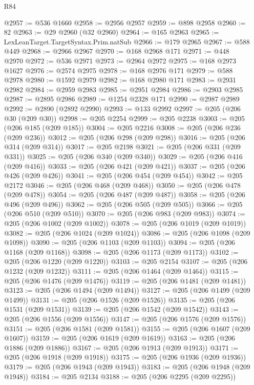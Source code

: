 \begin{lexlean}{R84}
\begin{coremodule}
@2957 := @536 @1660
@2958 := @2956 @2957
@2959 := @898 @2958
@2960 := 82
@2963 := @29 @2960 (@32 @2960)
@2964 := @165 @2963
@2965 := LexLeanTarget.TargetSyntax.Prim.natSub
@2966 := @179 @2965
@2967 := @588 @449
@2968 := @2966 @2967
@2970 := @168 @2968 @171
@2971 := @448 @2970
@2972 := @536 @2971
@2973 := @2964 @2972
@2975 := @168 @2973 @1627
@2976 := @2574 @2975
@2978 := @168 @2976 @171
@2979 := @588 @2978
@2980 := @1592 @2979
@2982 := @168 @2980 @171
@2983 := @2931 @2982
@2984 := @2959 @2983
@2985 := @2951 @2984
@2986 := @2903 @2985
@2987 := @2895 @2986
@2989 := @1254 @2328 @171
@2990 := @2987 @2989
@2992 := @2890 (@2892 @2990)
@2993 := @133 @2992
@2997 := @205 (@206 @30 (@209 @30))
@2998 := @205 @2254
@2999 := @205 @2238
@3003 := @205 (@206 @185 (@209 @185))
@3004 := @205 @2216
@3008 := @205 (@206 @236 (@209 @236))
@3012 := @205 (@206 @298 (@209 @298))
@3016 := @205 (@206 @314 (@209 @314))
@3017 := @205 @2198
@3021 := @205 (@206 @331 (@209 @331))
@3025 := @205 (@206 @340 (@209 @340))
@3029 := @205 (@206 @416 (@209 @416))
@3033 := @205 (@206 @421 (@209 @421))
@3037 := @205 (@206 @426 (@209 @426))
@3041 := @205 (@206 @454 (@209 @454))
@3042 := @205 @2172
@3046 := @205 (@206 @468 (@209 @468))
@3050 := @205 (@206 @478 (@209 @478))
@3054 := @205 (@206 @487 (@209 @487))
@3058 := @205 (@206 @496 (@209 @496))
@3062 := @205 (@206 @505 (@209 @505))
@3066 := @205 (@206 @510 (@209 @510))
@3070 := @205 (@206 @983 (@209 @983))
@3074 := @205 (@206 @1002 (@209 @1002))
@3078 := @205 (@206 @1019 (@209 @1019))
@3082 := @205 (@206 @1024 (@209 @1024))
@3086 := @205 (@206 @1098 (@209 @1098))
@3090 := @205 (@206 @1103 (@209 @1103))
@3094 := @205 (@206 @1168 (@209 @1168))
@3098 := @205 (@206 @1173 (@209 @1173))
@3102 := @205 (@206 @1220 (@209 @1220))
@3103 := @205 @2154
@3107 := @205 (@206 @1232 (@209 @1232))
@3111 := @205 (@206 @1464 (@209 @1464))
@3115 := @205 (@206 @1476 (@209 @1476))
@3119 := @205 (@206 @1481 (@209 @1481))
@3123 := @205 (@206 @1494 (@209 @1494))
@3127 := @205 (@206 @1499 (@209 @1499))
@3131 := @205 (@206 @1526 (@209 @1526))
@3135 := @205 (@206 @1531 (@209 @1531))
@3139 := @205 (@206 @1542 (@209 @1542))
@3143 := @205 (@206 @1556 (@209 @1556))
@3147 := @205 (@206 @1576 (@209 @1576))
@3151 := @205 (@206 @1581 (@209 @1581))
@3155 := @205 (@206 @1607 (@209 @1607))
@3159 := @205 (@206 @1619 (@209 @1619))
@3163 := @205 (@206 @1886 (@209 @1886))
@3167 := @205 (@206 @1913 (@209 @1913))
@3171 := @205 (@206 @1918 (@209 @1918))
@3175 := @205 (@206 @1936 (@209 @1936))
@3179 := @205 (@206 @1943 (@209 @1943))
@3183 := @205 (@206 @1948 (@209 @1948))
@3184 := @205 @2134
@3188 := @205 (@206 @2295 (@209 @2295))

\end{coremodule}
\end{lexlean}
